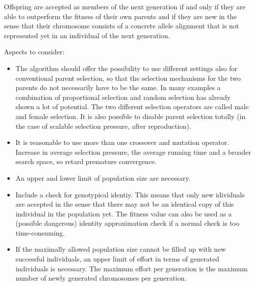 \documentclass[12pt]{book}
\begin{document}
Offspring are accepted as members of the next generation if and only if they are able to outperform the fitness of their own parents and if they are new in the sense that their chromosome consists of a concrete allele alignment that is not represented yet in an individual of the next generation.

Aspects to consider:
\begin{itemize}
\item The algorithm should offer the possibility to use different settings also for conventional parent selection, so that the selection mechanisms for the two parents do not necessarily have to be the same. In many examples a combination of proportional selection and random selection has already shown a lot of potential. The two different selection operators are called male and female selection. It is also possible to disable parent selection totally (in the case of scalable selection pressure, after reproduction).
\item It is reasonable to use more than one crossover and mutation operator. Increase in average selection pressure, the average running time and a broader search space, so retard premature convergence.
\item An upper and lower limit of population size are necessary.
\item Include a check for genotypical identiy. This means that only new idividuals are accepted in the sense that there may not be an identical copy of this individual in the population yet. The fitness value can also be used as a (possible dangerous) identity approximation check if a normal check is too time-consuming.
\item If the maximally allowed population size cannot be filled up with new successful individuals, an upper limit of effort in terms of generated individuals is necessary. The maximum effort per generation is the maximum number of newly generated chromosomes per generation.
\end{itemize}
\end{document}
